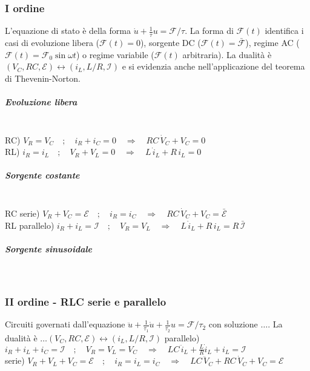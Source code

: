 \documentclass[11pt,a4paper]{article}
\begin{document}
\subsubsection{I ordine}
L'equazione di stato è della forma $\dot u + \frac1\tau u = \mathcal F/\tau$. La forma di $\mathcal F(t)$ identifica i casi di evoluzione libera ($\mathcal F(t) = 0$), sorgente DC ($\mathcal F(t) = \bar {\mathcal F}$), regime AC ($\mathcal F(t) = \mathcal F_0 \sin\omega t$) o regime variabile ($\mathcal F(t)$ arbitraria). La dualità è $(V_C, RC, \mathcal E) \leftrightarrow (i_L, L/R, \mathcal I)$ e si evidenzia anche nell'applicazione del teorema di Thevenin-Norton.\\
\subparagraph{Evoluzione libera}\mbox{}\\
RC) $V_R = V_C \quad;\quad i_R + i_C = 0 \quad\Rightarrow\quad RC\,\dot V_C + V_C = 0$\\
RL) $i_R = i_L \quad;\quad V_R + V_L = 0 \quad\Rightarrow\quad L\,\dot i_L + R\,i_L = 0$
\subparagraph{Sorgente costante}\mbox{}\\
RC serie) $V_R + V_C = \mathcal E \quad;\quad i_R = i_C \quad\Rightarrow\quad RC\,\dot V_C + V_C = \bar{\mathcal E}$\\
RL parallelo) $i_R + i_L = \mathcal I \quad;\quad V_R = V_L \quad\Rightarrow\quad L\,\dot i_L + R\,i_L = R\,\bar{\mathcal I}$
\subparagraph{Sorgente sinusoidale}\mbox{}\\

\subsubsection{II ordine - RLC serie e parallelo}
Circuiti governati dall'equazione $\ddot u + \frac1{\tau_1} \dot u + \frac1{\tau_2} u = \mathcal F/\tau_2$ con soluzione $\ldots$. La dualità è $\ldots(V_C, RC, \mathcal E) \leftrightarrow (i_L, L/R, \mathcal I)$
parallelo) $i_R + i_L + i_C = \mathcal I \quad;\quad V_R = V_L = V_C \quad\Rightarrow\quad LC\,\ddot i_L + \frac LR \dot i_L + i_L = \mathcal I$\\
serie) $V_R + V_L + V_C = \mathcal E \quad;\quad i_R = i_L = i_C \quad\Rightarrow\quad LC\,\ddot V_C + RC\, \dot V_C + V_C = \mathcal E$
\end{document}

